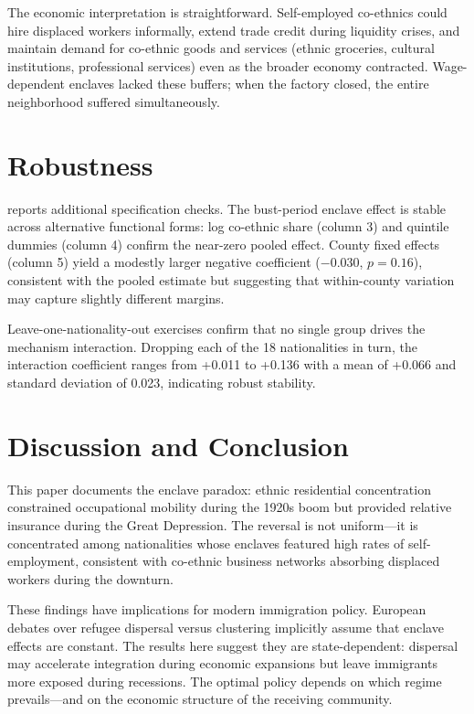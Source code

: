 \documentclass[12pt]{article}
\begin{document}
The economic interpretation is straightforward. Self-employed co-ethnics could hire displaced workers informally, extend trade credit during liquidity crises, and maintain demand for co-ethnic goods and services (ethnic groceries, cultural institutions, professional services) even as the broader economy contracted. Wage-dependent enclaves lacked these buffers; when the factory closed, the entire neighborhood suffered simultaneously.

{\small}


\section{Robustness}

 reports additional specification checks. The bust-period enclave effect is stable across alternative functional forms: log co-ethnic share (column 3) and quintile dummies (column 4) confirm the near-zero pooled effect. County fixed effects (column 5) yield a modestly larger negative coefficient ($-0.030$, $p = 0.16$), consistent with the pooled estimate but suggesting that within-county variation may capture slightly different margins.

Leave-one-nationality-out exercises confirm that no single group drives the mechanism interaction. Dropping each of the 18 nationalities in turn, the interaction coefficient ranges from +0.011 to +0.136 with a mean of +0.066 and standard deviation of 0.023, indicating robust stability.

{\small}


\section{Discussion and Conclusion}

This paper documents the enclave paradox: ethnic residential concentration constrained occupational mobility during the 1920s boom but provided relative insurance during the Great Depression. The reversal is not uniform---it is concentrated among nationalities whose enclaves featured high rates of self-employment, consistent with co-ethnic business networks absorbing displaced workers during the downturn.

These findings have implications for modern immigration policy. European debates over refugee dispersal versus clustering implicitly assume that enclave effects are constant. The results here suggest they are state-dependent: dispersal may accelerate integration during economic expansions but leave immigrants more exposed during recessions. The optimal policy depends on which regime prevails---and on the economic structure of the receiving community.
\end{document}

